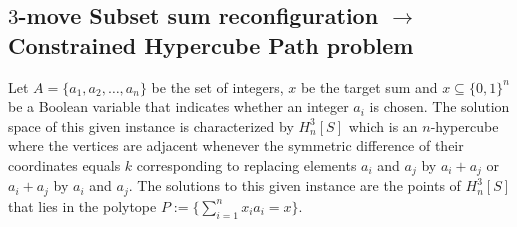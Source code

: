 \subsection{$3$-move Subset sum reconfiguration $\rightarrow$ Constrained Hypercube Path problem}
Let $A = \{a_1, a_2, \dots, a_n\}$ be the set of integers, $x$ be the target sum and $x \subseteq \{0,1\}^{n}$ be a Boolean variable that indicates
whether an integer $a_i$ is chosen. The solution space of this given instance is characterized by $H_{n}^{3}[S]$ which is an $n$-hypercube where
the vertices are adjacent whenever the symmetric difference of their coordinates equals $k$ corresponding to replacing
elements $a_i$ and $a_j$ by $a_i + a_j$ or $a_i + a_j$ by $a_i$ and $a_j$. The solutions to this given instance are the points of
$H_{n}^{3}[S]$ that lies in the polytope $P := \{ \sum_{i=1}^{n} x_{i}a_{i} = x\}$.


